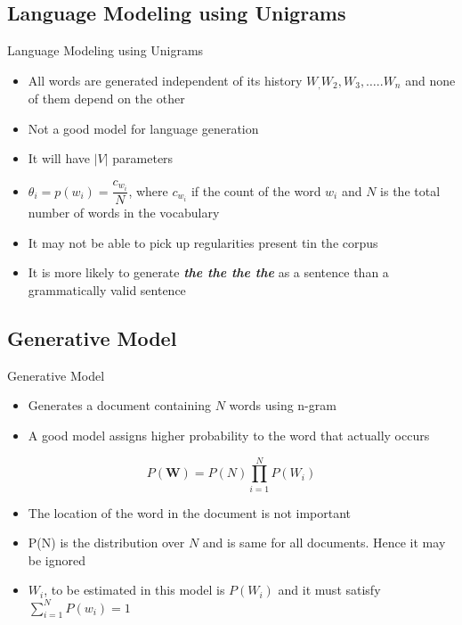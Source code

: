 \subsection{Language Modeling using Unigrams}
\begin{frame}{Language Modeling using Unigrams}
\begin{itemize}
	\item All words are generated independent of its history $W_,W_2,W_3,\ldots..W_n$ and none of them depend on the other
	\item Not a good model for language generation
	\item It will have $\left|V\right|$ parameters
	\item $ \theta_i = p(w_i) = \dfrac{c_{w_i}}{N}$, where $c_{w_i}$ if the count of the word $w_i$ and $N$ is the total number of words in the vocabulary
	\item It may not be able to pick up regularities present tin the corpus
	\item It is more likely to generate \textit{\textbf{the the the the}} as a sentence than a grammatically valid sentence

\end{itemize}

\end{frame}

\subsection{Generative Model}
\begin{frame}{Generative Model}
\begin{itemize}
	\item Generates a document containing $N$ words using n-gram
	\item A good model assigns higher probability to the word that actually occurs
\end{itemize}

\begin{equation}
	P(\mathbf{W}) = P(N)\displaystyle{\prod_{i=1}^{N}P(W_i)}
\end{equation}
\begin{itemize}
	\item The location of the word in the document is not important
	\item P(N) is the distribution over $N$ and is same for all documents. Hence it may be ignored
	\item  $W_i$, to be estimated in this model is $P(W_i)$ and it must satisfy $\sum_{i=1}^{N}P(w_i) = 1$
\end{itemize}


\end{frame}

